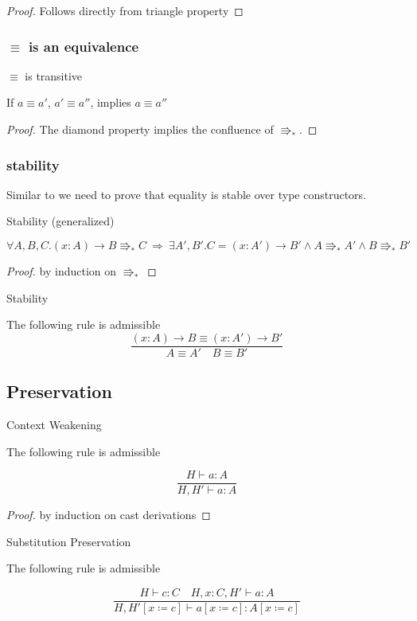 \begin{proof}
Follows directly from triangle property
\end{proof}
 
\subsubsection{$\equiv$ is an equivalence}
 
\begin{thm}
$\equiv$ is transitive
 
If $a\equiv a'$, $a'\equiv a''$, implies $a\equiv a''$
\end{thm}
 
\begin{proof}
The diamond property implies the confluence of $\Rrightarrow_{\ast}$.
\end{proof}
 
\subsubsection{stability}
Similar to  we need to prove that equality is stable over type constructors.
\begin{lem}
Stability (generalized)
 
$\forall A,B,C.\left(x:A\right)\rightarrow B\Rrightarrow_{\ast}C\:\Rightarrow\:\exists A',B'.C=\left(x:A'\right)\rightarrow B'\land A\Rrightarrow_{\ast}A'\land B\Rrightarrow_{\ast}B'$
\end{lem}
 
\begin{proof}
by induction on $\Rrightarrow_{\ast}$
\end{proof}
\begin{cor}
Stability
 
The following rule is admissible
\[
\frac{\left(x:A\right)\rightarrow B\equiv\left(x:A'\right)\rightarrow B'}{A\equiv A'\quad B\equiv B'}
\]
\end{cor}
 
 
\subsection{Preservation}
\begin{lem}
Context Weakening
 
The following rule is admissible
 
\[
\frac{H\vdash a:A}{H,H'\vdash a:A}
\]
\end{lem}
 
\begin{proof}
by induction on cast derivations
\end{proof}
\begin{lem}
Substitution Preservation
 
The following rule is admissible
 
\[
\frac{H\vdash c:C\quad H,x:C,H'\vdash a:A}{H,H'\left[x\coloneqq c\right]\vdash a\left[x\coloneqq c\right]:A\left[x\coloneqq c\right]}
\]
\end{lem}
 
